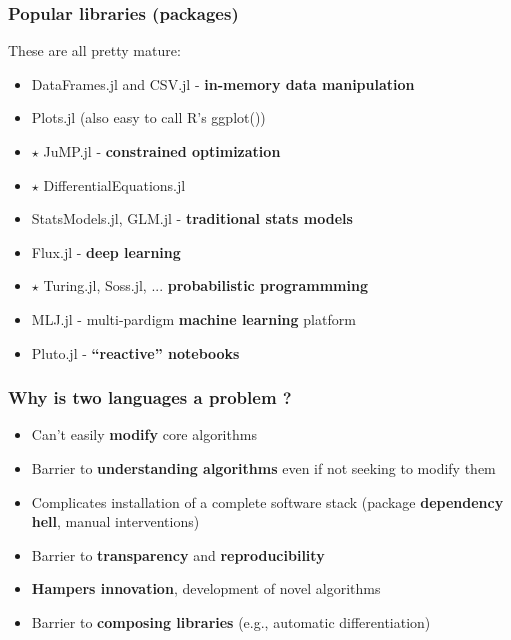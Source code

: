 \documentclass[t]{beamer}
\newcommand\df{\bf\color{Maroon}}
\begin{document}
  


\begin{frame}
  \frametitle{Popular libraries (packages)}
  These are all pretty mature:
  \begin{itemize}
  \item DataFrames.jl and CSV.jl  - {\df in-memory data manipulation}
  \item Plots.jl (also easy to call R's ggplot())
  \item $\star$ JuMP.jl - {\df constrained optimization}
  \item $\star$ DifferentialEquations.jl
  \item StatsModels.jl, GLM.jl - {\df traditional stats models}
  \item Flux.jl  - {\df deep learning}
  \item $\star$ Turing.jl, Soss.jl, ... {\df probabilistic programmming}
  \item MLJ.jl - multi-pardigm {\df machine learning} platform
  \item Pluto.jl - {\df ``reactive'' notebooks}
  \end{itemize}
\end{frame}


  
\begin{frame}
  \frametitle{Why  is two languages a problem ?}
  \begin{itemize}
    \item Can't easily {\df modify} core algorithms
    \item Barrier to {\df understanding algorithms} even if not seeking to modify them
    \item Complicates installation of a complete software stack
    (package {\df dependency hell}, manual interventions)
    \item Barrier to {\df transparency} and {\df reproducibility}
    \item {\df Hampers innovation}, development of novel algorithms
    \item Barrier to {\df composing libraries} (e.g., automatic differentiation)
  \end{itemize}
\end{frame}
\end{document}
